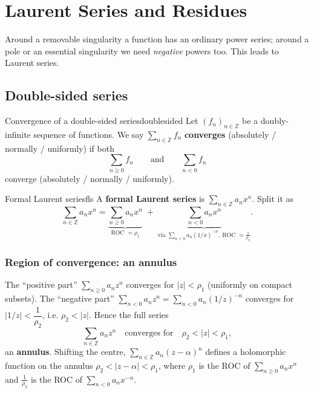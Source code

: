 \documentclass[11pt,openany]{report}
\newcommand{\Z}{\mathbb{Z}}
\newcommand{\abs}[1]{\left\lvert #1 \right\rvert}
\begin{document}
\chapter{Laurent Series and Residues}

Around a removable singularity a function has an ordinary power series; around a pole or an
essential singularity we need \emph{negative} powers too. This leads to Laurent series.

\section{Double-sided series}

\begin{definition}{Convergence of a double-sided series}{doublesided}
Let $(f_n)_{n\in\Z}$ be a doubly-infinite sequence of functions. We say
$\sum_{n\in\Z} f_n$ \textbf{converges} (absolutely / normally / uniformly) if both
\[
  \sum_{n\ge0} f_n \qquad\text{and}\qquad \sum_{n<0} f_n
\]
converge (absolutely / normally / uniformly).
\end{definition}

\begin{definition}{Formal Laurent series}{fls}
A \textbf{formal Laurent series} is $\sum_{n\in\Z} a_n x^n$. Split it as
\[
  \sum_{n\in\Z} a_n x^n = \underbrace{\sum_{n\ge0} a_n x^n}_{\text{ROC }=\rho_1}
  \;+\; \underbrace{\sum_{n<0} a_n x^{n}}_{\text{via } \sum_{n<0}a_n (1/x)^{-n},\ \text{ROC }=\frac{1}{\rho_2}} .
\]
\end{definition}

\subsection{Region of convergence: an annulus}

The ``positive part'' $\sum_{n\ge0} a_n z^n$ converges for $\abs z<\rho_1$ (uniformly on
compact subsets). The ``negative part'' $\sum_{n<0} a_n z^n=\sum_{n<0} a_n(1/z)^{-n}$
converges for $\abs{1/z}<\dfrac{1}{\rho_2}$, i.e. $\rho_2<\abs z$. Hence the full series
\[
  \sum_{n\in\Z} a_n z^n \quad\text{converges for}\quad \rho_2 < \abs z < \rho_1 ,
\]
an \textbf{annulus}. Shifting the centre, $\sum_{n\in\Z} a_n(z-\alpha)^n$ defines a
holomorphic function on the annulus $\rho_2<\abs{z-\alpha}<\rho_1$, where $\rho_1$ is the
ROC of $\sum_{n\ge0}a_n x^n$ and $\frac1{\rho_2}$ is the ROC of $\sum_{n<0}a_n x^{-n}$.
\end{document}

